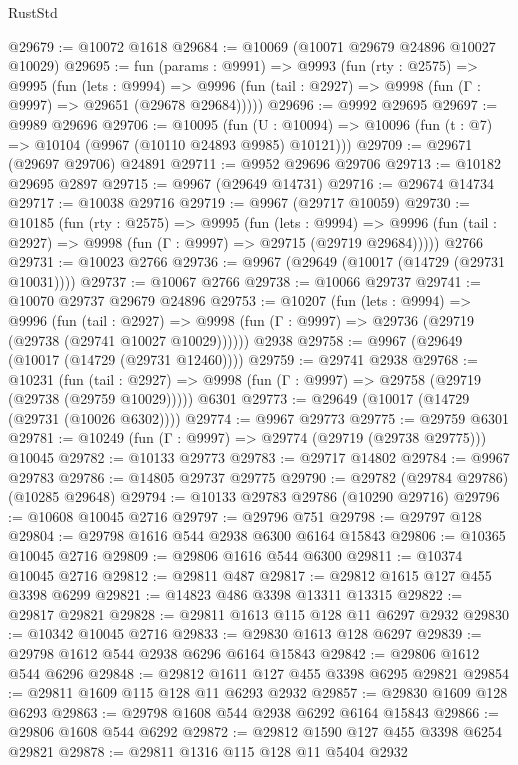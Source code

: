 \begin{lexlean}{RustStd}
\begin{coremodule}
@29679 := @10072 @1618
@29684 := @10069 (@10071 @29679 @24896 @10027 @10029)
@29695 := fun (params : @9991) =>
  @9993
    (fun (rty : @2575) =>
    @9995
      (fun (lets : @9994) =>
      @9996 (fun (tail : @2927) => @9998 (fun (Γ : @9997) => @29651 (@29678 @29684)))))
@29696 := @9992 @29695
@29697 := @9989 @29696
@29706 := @10095
    (fun (U : @10094) => @10096 (fun (t : @7) => @10104 (@9967 (@10110 @24893 @9985) @10121)))
@29709 := @29671 (@29697 @29706) @24891
@29711 := @9952 @29696 @29706
@29713 := @10182 @29695 @2897
@29715 := @9967 (@29649 @14731)
@29716 := @29674 @14734
@29717 := @10038 @29716
@29719 := @9967 (@29717 @10059)
@29730 := @10185
    (fun (rty : @2575) =>
    @9995
      (fun (lets : @9994) =>
      @9996 (fun (tail : @2927) => @9998 (fun (Γ : @9997) => @29715 (@29719 @29684)))))
    @2766
@29731 := @10023 @2766
@29736 := @9967 (@29649 (@10017 (@14729 (@29731 @10031))))
@29737 := @10067 @2766
@29738 := @10066 @29737
@29741 := @10070 @29737 @29679 @24896
@29753 := @10207
    (fun (lets : @9994) =>
    @9996
      (fun (tail : @2927) =>
      @9998 (fun (Γ : @9997) => @29736 (@29719 (@29738 (@29741 @10027 @10029))))))
    @2938
@29758 := @9967 (@29649 (@10017 (@14729 (@29731 @12460))))
@29759 := @29741 @2938
@29768 := @10231
    (fun (tail : @2927) => @9998 (fun (Γ : @9997) => @29758 (@29719 (@29738 (@29759 @10029)))))
    @6301
@29773 := @29649 (@10017 (@14729 (@29731 (@10026 @6302))))
@29774 := @9967 @29773
@29775 := @29759 @6301
@29781 := @10249 (fun (Γ : @9997) => @29774 (@29719 (@29738 @29775))) @10045
@29782 := @10133 @29773
@29783 := @29717 @14802
@29784 := @9967 @29783
@29786 := @14805 @29737 @29775
@29790 := @29782 (@29784 @29786) (@10285 @29648)
@29794 := @10133 @29783 @29786 (@10290 @29716)
@29796 := @10608 @10045 @2716
@29797 := @29796 @751
@29798 := @29797 @128
@29804 := @29798 @1616 @544 @2938 @6300 @6164 @15843
@29806 := @10365 @10045 @2716
@29809 := @29806 @1616 @544 @6300
@29811 := @10374 @10045 @2716
@29812 := @29811 @487
@29817 := @29812 @1615 @127 @455 @3398 @6299
@29821 := @14823 @486 @3398 @13311 @13315
@29822 := @29817 @29821
@29828 := @29811 @1613 @115 @128 @11 @6297 @2932
@29830 := @10342 @10045 @2716
@29833 := @29830 @1613 @128 @6297
@29839 := @29798 @1612 @544 @2938 @6296 @6164 @15843
@29842 := @29806 @1612 @544 @6296
@29848 := @29812 @1611 @127 @455 @3398 @6295 @29821
@29854 := @29811 @1609 @115 @128 @11 @6293 @2932
@29857 := @29830 @1609 @128 @6293
@29863 := @29798 @1608 @544 @2938 @6292 @6164 @15843
@29866 := @29806 @1608 @544 @6292
@29872 := @29812 @1590 @127 @455 @3398 @6254 @29821
@29878 := @29811 @1316 @115 @128 @11 @5404 @2932

\end{coremodule}
\end{lexlean}
